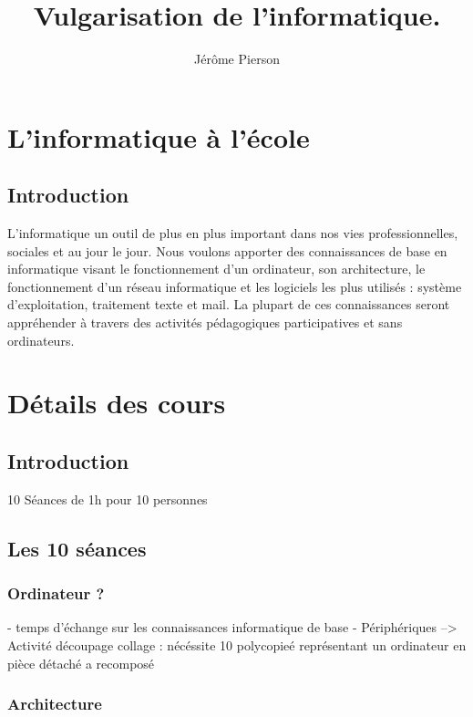 \documentclass[a4paper,11pt]{report}
\title{Vulgarisation de l'informatique.}
\author{Jérôme Pierson}
\begin{document}
\maketitle

\begin{abstract}
\end{abstract}


\part{L'informatique à l'école}
\chapter{Introduction}
L'informatique un outil de plus en plus important dans nos vies professionnelles, sociales et au jour le jour. Nous voulons apporter des connaissances de base en informatique visant le fonctionnement d'un ordinateur, son architecture, le fonctionnement d'un réseau informatique et les logiciels les plus utilisés : système d'exploitation, traitement texte et mail. La plupart de ces connaissances seront appréhender à travers des activités pédagogiques participatives et sans ordinateurs. 
\part{Détails des cours}
\chapter{Introduction}



10 Séances de 1h pour 10 personnes
\chapter{Les 10 séances}

\section{Ordinateur ?}

- temps d'échange sur les connaissances informatique de base
- Périphériques
--> Activité découpage collage : nécéssite 10 polycopieé représentant un ordinateur en pièce détaché a recomposé

\section{Architecture}
\end{document}
